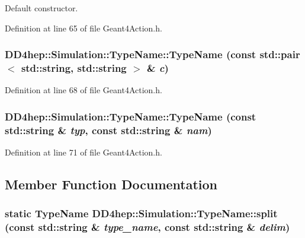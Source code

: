 Default constructor. 

Definition at line 65 of file Geant4Action.h.\hypertarget{class_d_d4hep_1_1_simulation_1_1_type_name_ad33e6295683ae918b2ea2daad18b7917}{
\subsubsection[{TypeName}]{\setlength{\rightskip}{0pt plus 5cm}DD4hep::Simulation::TypeName::TypeName (const std::pair$<$ std::string, std::string $>$ \& {\em c})}}
\label{class_d_d4hep_1_1_simulation_1_1_type_name_ad33e6295683ae918b2ea2daad18b7917}


Definition at line 68 of file Geant4Action.h.\hypertarget{class_d_d4hep_1_1_simulation_1_1_type_name_a2d20b1a7a7d29a660d2fb3a7f471a78d}{
\subsubsection[{TypeName}]{\setlength{\rightskip}{0pt plus 5cm}DD4hep::Simulation::TypeName::TypeName (const std::string \& {\em typ}, \/  const std::string \& {\em nam})}}
\label{class_d_d4hep_1_1_simulation_1_1_type_name_a2d20b1a7a7d29a660d2fb3a7f471a78d}


Definition at line 71 of file Geant4Action.h.

\subsection{Member Function Documentation}
\hypertarget{class_d_d4hep_1_1_simulation_1_1_type_name_a63ab3d8b4c1f48ad15d6dd58643a2eaa}{
\subsubsection[{split}]{\setlength{\rightskip}{0pt plus 5cm}static {\bf TypeName} DD4hep::Simulation::TypeName::split (const std::string \& {\em type\_\-name}, \/  const std::string \& {\em delim})}}
\label{class_d_d4hep_1_1_simulation_1_1_type_name_a63ab3d8b4c1f48ad15d6dd58643a2eaa}


